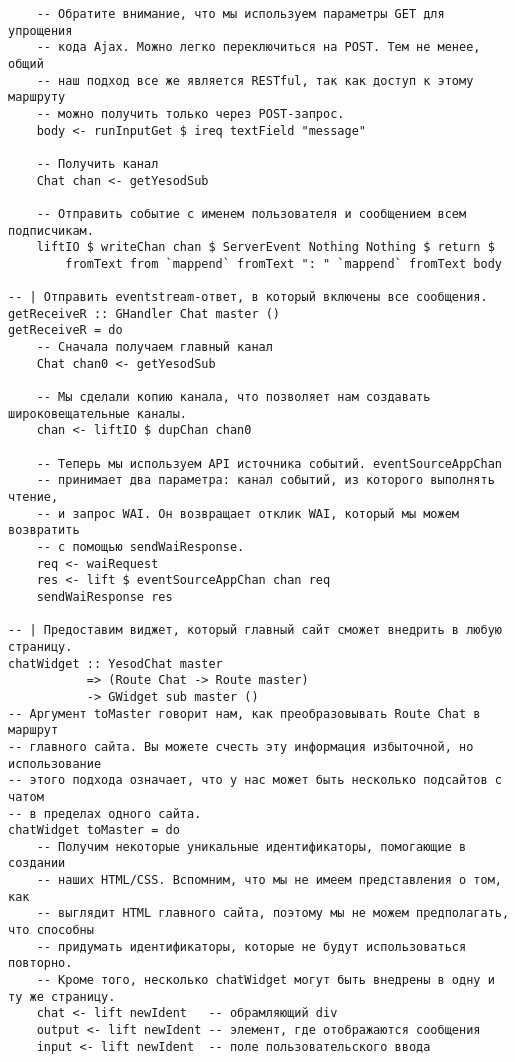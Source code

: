 \begin{lstlisting}
    -- Обратите внимание, что мы используем параметры GET для упрощения
    -- кода Ajax. Можно легко переключиться на POST. Тем не менее, общий 
    -- наш подход все же является RESTful, так как доступ к этому маршруту
    -- можно получить только через POST-запрос.
    body <- runInputGet $ ireq textField "message"

    -- Получить канал
    Chat chan <- getYesodSub

    -- Отправить событие с именем пользователя и сообщением всем подписчикам.
    liftIO $ writeChan chan $ ServerEvent Nothing Nothing $ return $
        fromText from `mappend` fromText ": " `mappend` fromText body

-- | Отправить eventstream-ответ, в который включены все сообщения.
getReceiveR :: GHandler Chat master ()
getReceiveR = do
    -- Сначала получаем главный канал
    Chat chan0 <- getYesodSub

    -- Мы сделали копию канала, что позволяет нам создавать широковещательные каналы.
    chan <- liftIO $ dupChan chan0

    -- Теперь мы используем API источника событий. eventSourceAppChan
    -- принимает два параметра: канал событий, из которого выполнять чтение,
    -- и запрос WAI. Он возвращает отклик WAI, который мы можем возвратить
    -- с помощью sendWaiResponse.
    req <- waiRequest
    res <- lift $ eventSourceAppChan chan req
    sendWaiResponse res

-- | Предоставим виджет, который главный сайт сможет внедрить в любую страницу.
chatWidget :: YesodChat master
           => (Route Chat -> Route master)
           -> GWidget sub master ()
-- Аргумент toMaster говорит нам, как преобразовывать Route Chat в маршрут
-- главного сайта. Вы можете счесть эту информация избыточной, но использование
-- этого подхода означает, что у нас может быть несколько подсайтов с чатом
-- в пределах одного сайта.
chatWidget toMaster = do
    -- Получим некоторые уникальные идентификаторы, помогающие в создании
    -- наших HTML/CSS. Вспомним, что мы не имеем представления о том, как
    -- выглядит HTML главного сайта, поэтому мы не можем предполагать, что способны
    -- придумать идентификаторы, которые не будут использоваться повторно.
    -- Кроме того, несколько chatWidget могут быть внедрены в одну и ту же страницу.
    chat <- lift newIdent   -- обрамляющий div
    output <- lift newIdent -- элемент, где отображаются сообщения
    input <- lift newIdent  -- поле пользовательского ввода


\end{lstlisting}
